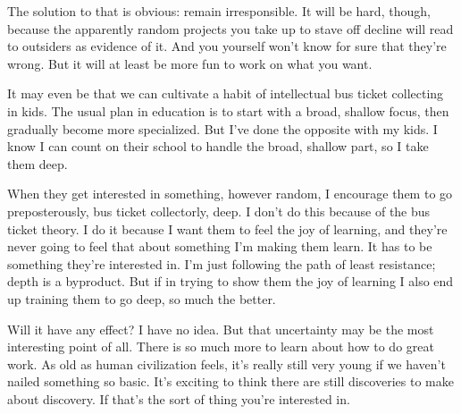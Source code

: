 The solution to that is obvious: remain irresponsible. It will be hard,
though, because the apparently random projects you take up to stave off
decline will read to outsiders as evidence of it. And you yourself won't
know for sure that they're wrong. But it will at least be more fun to
work on what you want.

It may even be that we can cultivate a habit of intellectual bus ticket
collecting in kids. The usual plan in education is to start with a
broad, shallow focus, then gradually become more specialized. But I've
done the opposite with my kids. I know I can count on their school to
handle the broad, shallow part, so I take them deep.

When they get interested in something, however random, I encourage them
to go preposterously, bus ticket collectorly, deep. I don't do this
because of the bus ticket theory. I do it because I want them to feel
the joy of learning, and they're never going to feel that about
something I'm making them learn. It has to be something they're
interested in. I'm just following the path of least resistance; depth is
a byproduct. But if in trying to show them the joy of learning I also
end up training them to go deep, so much the better.

Will it have any effect? I have no idea. But that uncertainty may be the
most interesting point of all. There is so much more to learn about how
to do great work. As old as human civilization feels, it's really still
very young if we haven't nailed something so basic. It's exciting to
think there are still discoveries to make about discovery. If that's the
sort of thing you're interested in.


